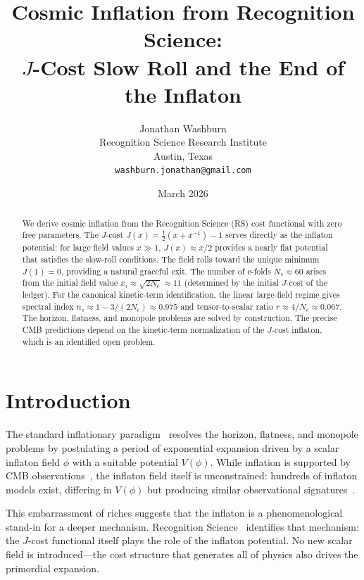 \documentclass[12pt,a4paper]{article}
\title{Cosmic Inflation from Recognition Science:\\
$J$-Cost Slow Roll and the End of the Inflaton}
\author{Jonathan Washburn\\
Recognition Science Research Institute\\
Austin, Texas\\
\texttt{washburn.jonathan@gmail.com}}
\date{March 2026}
\theoremstyle{definition}
\theoremstyle{remark}
\begin{document}
\maketitle

\begin{abstract}
We derive cosmic inflation from the Recognition Science (RS)
cost functional with zero free parameters.  The $J$-cost
$J(x) = \tfrac{1}{2}(x + x^{-1}) - 1$ serves directly as
the inflaton potential: for large field values $x \gg 1$,
$J(x) \approx x/2$ provides a nearly flat potential that
satisfies the slow-roll conditions.  The field rolls toward
the unique minimum $J(1) = 0$, providing a natural graceful
exit.  The number of e-folds $N_e \approx 60$ arises from
the initial field value $x_i \approx \sqrt{2N_e} \approx 11$
(determined by the initial $J$-cost of the ledger).
For the canonical kinetic-term identification, the linear
large-field regime gives spectral index
$n_s \approx 1 - 3/(2N_e) \approx 0.975$ and
tensor-to-scalar ratio $r \approx 4/N_e \approx 0.067$.
The horizon, flatness, and monopole problems are solved by
construction.  The precise CMB predictions depend on the
kinetic-term normalization of the $J$-cost inflaton, which
is an identified open problem.
\end{abstract}

\section{Introduction}
\label{sec:intro}

The standard inflationary paradigm~\cite{Guth1981,Linde1982}
resolves the horizon, flatness, and monopole problems by
postulating a period of exponential expansion driven by a
scalar inflaton field $\phi$ with a suitable potential
$V(\phi)$.  While inflation is supported by CMB
observations~\cite{Planck2018}, the inflaton field itself is
unconstrained: hundreds of inflaton models exist, differing
in $V(\phi)$ but producing similar observational
signatures~\cite{Martin2014}.

This embarrassment of riches suggests that the inflaton is a
phenomenological stand-in for a deeper mechanism.
Recognition Science~\cite{RS_Axioms} identifies that mechanism: the
$J$-cost functional itself plays the role of the inflaton potential.
No new scalar field is introduced---the cost structure that
generates all of physics also drives the primordial
expansion.
\end{document}
